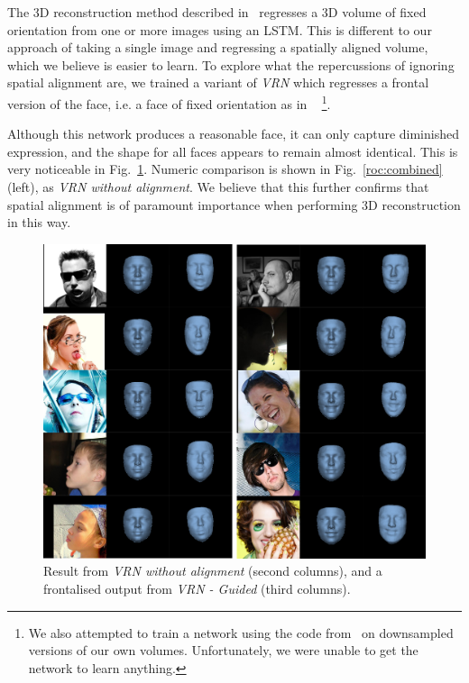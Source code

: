   The 3D reconstruction method described
  in~\cite{choy20163d} regresses a 3D volume of fixed orientation from one or more images
  using an LSTM. This is different to our approach of taking a single
  image and regressing a spatially aligned volume, which we believe is
  easier to learn. To explore what the repercussions of ignoring spatial alignment are, we trained a variant of \textit{VRN} which regresses a frontal version of the face, i.e. a face of fixed orientation as in ~\cite{choy20163d} \footnote{ We also attempted to train a network using the code
  from~\cite{choy20163d} on downsampled versions of our own
  volumes. Unfortunately, we were unable to get the network to learn anything.}.

  Although this network produces a reasonable face, it can only capture diminished expression, and
  the shape for all faces appears to remain almost identical. This is very noticeable in Fig.~\ref{fig:frontal_visual}. Numeric comparison is shown in Fig.~\ref{roc:combined} (left), as \textit{VRN without alignment}. We believe that this further confirms that spatial alignment is of paramount importance when performing 3D reconstruction in this way.




\begin{figure}
\includegraphics[width=\linewidth]{img/frontal.png}
\caption{Result from \textit{VRN without alignment} (second columns), and a frontalised output from \textit{VRN - Guided} (third columns).}
  \label{fig:frontal_visual}
\end{figure}

